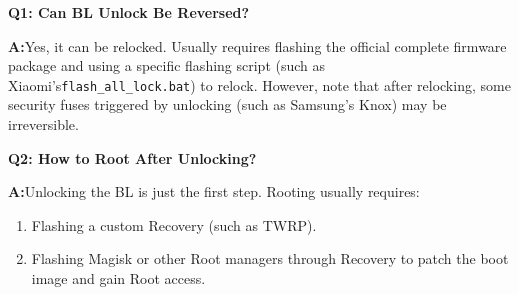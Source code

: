 
\textbf{Q1: Can BL Unlock Be Reversed?}\par

\textbf{A:}Yes, it can be relocked. Usually requires flashing the official complete firmware package and using a specific flashing script (such as Xiaomi's\texttt{flash\_all\_lock.\allowbreak bat}) to relock. However, note that after relocking, some security fuses triggered by unlocking (such as Samsung's Knox) may be irreversible.

\textbf{Q2: How to Root After Unlocking?}\par

\textbf{A:}Unlocking the BL is just the first step. Rooting usually requires:

\begin{enumerate}
  \item Flashing a custom Recovery (such as TWRP).
  \item Flashing Magisk or other Root managers through Recovery to patch the boot image and gain Root access.
\end{enumerate}
